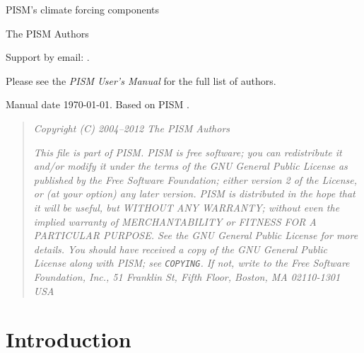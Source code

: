 \documentclass[titlepage,letterpaper,final]{scrartcl}
\begin{document}
\begin{titlepage}

  \begin{center}
    \vspace*{3.5cm}
    {\huge{} PISM's climate forcing components}
    \vspace{0.5cm}

    {\Large The PISM Authors}
    \vspace{1cm}
  \end{center}

\setcounter{tocdepth}{3}
\small
\tableofcontents
\normalsize

\vspace{0.3in}

  \begin{center}
    \small Support by email: \PISMEMAIL.

    \medskip
    Please see the \emph{PISM User's Manual} for the full list of authors.

    \medskip
    Manual date \today.  Based on PISM \PISMREV.

    \medskip
    \PISMDOWNLOADMSG
 \end{center}

\vspace{0.3in}
\begin{quote}
  \textsl{Copyright (C) 2004--2012 The PISM Authors}
  \medskip

  \noindent \textsl{This file is part of PISM.  PISM is free software; you can redistribute it and/or modify it under the terms of the GNU General Public License as published by the Free Software Foundation; either version 2 of the License, or (at your option) any later version.  PISM is distributed in the hope that it will be useful, but WITHOUT ANY WARRANTY; without even the implied warranty of MERCHANTABILITY or FITNESS FOR A PARTICULAR PURPOSE.  See the GNU General Public License for more details.  You should have received a copy of the GNU General Public License along with PISM; see \emph{\texttt{COPYING}}.  If not, write to the Free Software Foundation, Inc., 51 Franklin St, Fifth Floor, Boston, MA  02110-1301 USA}
\end{quote}
\normalsize

\end{titlepage}

\newpage


\section{Introduction}
\label{sec:intro}
\end{document}
